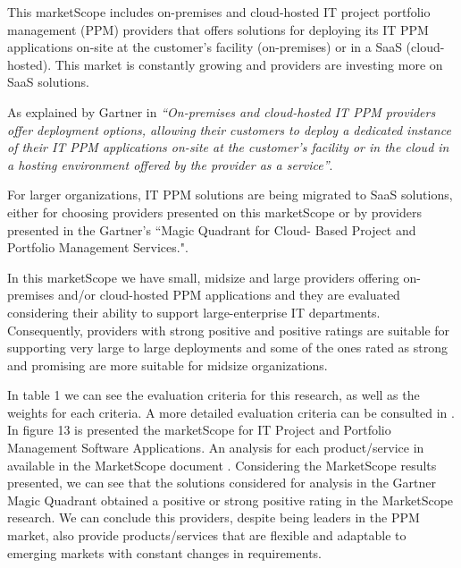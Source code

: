 This marketScope includes on-premises and cloud-hosted IT project portfolio management (PPM) providers that offers solutions for deploying its IT PPM applications on-site at the customer's facility (on-premises) or in a SaaS (cloud-hosted). This market is constantly growing and providers are investing more on SaaS solutions.\par
As explained by Gartner in \cite{MarketScopePPM} \textit{``On-premises and cloud-hosted IT PPM providers offer deployment options, allowing their customers to deploy a dedicated instance of their IT PPM applications on-site at the customer's facility or in the cloud in a hosting environment offered by the provider as a service''}.\par
For larger organizations, IT PPM solutions are being migrated to SaaS solutions, either for choosing providers presented on this marketScope or by providers presented in the Gartner's ``Magic Quadrant for Cloud- Based Project and Portfolio Management Services."\cite{magicQuadrantCloud}.\par
In this marketScope we have small, midsize and large providers offering on-premises and/or cloud-hosted PPM applications and they are evaluated considering their ability to support large-enterprise IT departments. Consequently, providers with strong positive and positive ratings are suitable for supporting very large to large deployments and some of the ones rated as strong and promising are more suitable for midsize organizations.\par
In table 1 we can see the evaluation criteria for this research, as well as the weights for each criteria. A more detailed evaluation criteria can be consulted in \cite{MarketScopePPM}. In figure 13 is presented the marketScope for IT Project and Portfolio Management Software Applications. An analysis for each product/service in available in the MarketScope document \cite{MarketScopePPM}.
Considering the MarketScope results presented, we can see that the solutions considered for analysis in the Gartner Magic Quadrant obtained a positive or strong positive rating in the MarketScope research. We can conclude this providers, despite being leaders in the PPM market, also provide products/services that are flexible and adaptable to emerging markets with constant changes in requirements.


